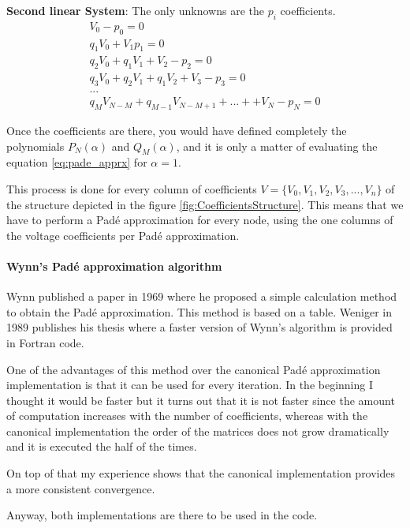\documentclass[nols,a4paper,twoside,notoc,fleqn]{tufte-book}
\begin{document}
\textbf{Second linear System}: The only unknowns are the $p_i$ coefficients.
\begin{equation}
\begin{matrix}
V_0 - p_0=0\\
q_1V_0 + V_1  p_1=0\\
q_2V_0 + q_1V_1+V_2-p_2=0\\
q_3V_0 + q_2V_1 + q_1V_2 + V_3 - p_3 = 0\\
...\\
q_MV_{N-M} + q_{M-1}V_{N-M+1} + ... + +V_N - p_N=0
\end{matrix}
\end{equation}

Once the coefficients are there, you would have defined completely the polynomials $P_N(\alpha)$ and $Q_M(\alpha)$, and it is only a matter of evaluating the equation \ref{eq:pade_apprx} for $\alpha=1$.\newline


This process is done for every column of coefficients ${V}=\{V_0, V_1,V_2,V_3, ...,V_n\}$ of the structure depicted in the figure \ref{fig:CoefficientsStructure}. This means that we have to perform a Pad\'e approximation for every node, using the one columns of the voltage coefficients per Pad\'e approximation.

\paragraph{Wynn's Pad\'e approximation algorithm}

Wynn published a paper in 1969 where he proposed a simple calculation method to obtain the Pad\'e approximation. This method is based on a table. Weniger in 1989 publishes his thesis where a faster version of Wynn's algorithm is provided in Fortran code. 


One of the advantages of this method over the canonical Pad\'e approximation implementation is that it can be used for every iteration. In the beginning I thought it would be faster but it turns out that it is not faster since the amount of computation increases with the number of coefficients, whereas with the canonical implementation the order of the matrices does not grow dramatically and it is executed the half of the times.

On top of that my experience shows that the canonical implementation provides a more consistent convergence.

Anyway, both implementations are there to be used in the code.
\end{document}
